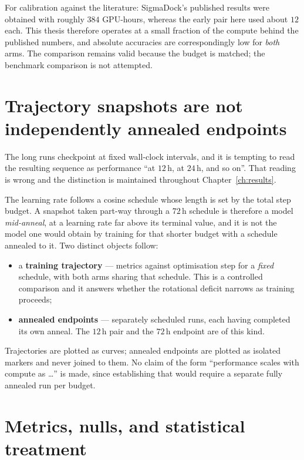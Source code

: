 For calibration against the literature: SigmaDock's published results were
obtained with roughly $384$ GPU-hours, whereas the early pair here used about
$12$ each. This thesis therefore operates at a small fraction of the compute
behind the published numbers, and absolute accuracies are correspondingly low
for \emph{both} arms. The comparison remains valid because the budget is
matched; the benchmark comparison is not attempted.

\section{Trajectory snapshots are not independently annealed endpoints}
\label{sec:snapshot-caveat}

The long runs checkpoint at fixed wall-clock intervals, and it is tempting to
read the resulting sequence as performance ``at $12$\,h, at $24$\,h, and so
on''. That reading is wrong and the distinction is maintained throughout
Chapter~\ref{ch:results}.

The learning rate follows a cosine schedule whose length is set by the total
step budget. A snapshot taken part-way through a $72$\,h schedule is therefore
a model \emph{mid-anneal}, at a learning rate far above its terminal value,
and it is not the model one would obtain by training for that shorter budget
with a schedule annealed to it. Two distinct objects follow:

\begin{itemize}[leftmargin=*,itemsep=2pt]
\item a \textbf{training trajectory} --- metrics against optimisation step for
      a \emph{fixed} schedule, with both arms sharing that schedule. This is a
      controlled comparison and it answers whether the rotational deficit
      narrows as training proceeds;
\item \textbf{annealed endpoints} --- separately scheduled runs, each having
      completed its own anneal. The $12$\,h pair and the $72$\,h endpoint are
      of this kind.
\end{itemize}

Trajectories are plotted as curves; annealed endpoints are plotted as isolated
markers and never joined to them. No claim of the form ``performance scales
with compute as \ldots'' is made, since establishing that would require a
separate fully annealed run per budget.

\section{Metrics, nulls, and statistical treatment}
\label{sec:stats}

